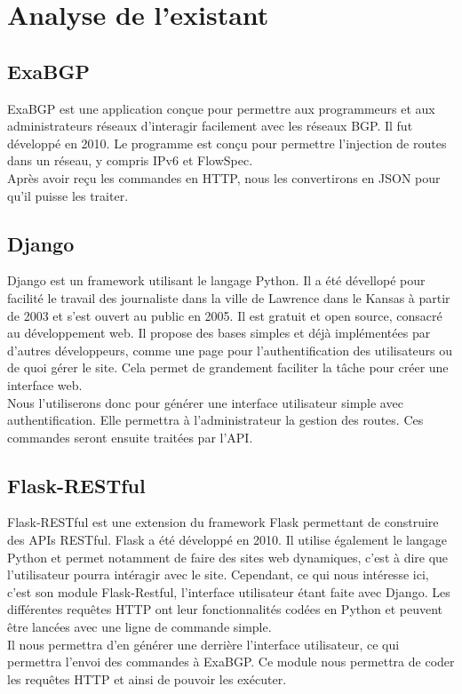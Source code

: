 \chapter{Analyse de l'existant}

\section{ExaBGP}
ExaBGP est une application conçue pour permettre aux programmeurs et aux administrateurs réseaux d’interagir facilement avec les réseaux BGP. Il fut développé en 2010. Le programme est conçu pour permettre l’injection de routes dans un réseau, y compris IPv6 et FlowSpec.
\cite{Man10} \\ \indent
Après avoir reçu les commandes en HTTP, nous les convertirons en JSON pour qu'il puisse les traiter.

\section{Django}
Django est un framework utilisant le langage Python. Il a été dévellopé pour facilité le travail des journaliste dans la ville de Lawrence dans le Kansas à partir de 2003 et s'est ouvert au public en 2005. Il est gratuit et open source, consacré au développement web. Il propose des bases simples et déjà implémentées par d'autres développeurs, comme une page pour l'authentification des utilisateurs ou de quoi gérer le site. Cela permet de grandement faciliter la tâche pour créer une interface web. \\ \indent Nous l'utiliserons donc pour générer une interface utilisateur simple avec authentification. Elle permettra à l'administrateur la gestion des routes. Ces commandes seront ensuite traitées par l'API.

\section{Flask-RESTful}
Flask-RESTful est une extension du framework Flask permettant de construire des APIs RESTful. Flask a été développé en 2010. Il utilise également le langage Python et permet notamment de faire des sites web dynamiques, c'est à dire que l'utilisateur pourra intéragir avec le site. Cependant, ce qui nous intéresse ici, c'est son module Flask-Restful, l'interface utilisateur étant faite avec Django. Les différentes requêtes HTTP ont leur fonctionnalités codées en Python et peuvent être lancées avec une ligne de commande simple.\\ \indent
Il nous permettra d'en générer une derrière l'interface utilisateur, ce qui permettra l'envoi des commandes à ExaBGP. Ce module nous permettra de coder les requêtes HTTP et ainsi de pouvoir les exécuter.

